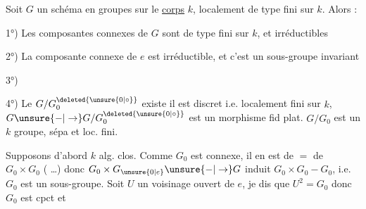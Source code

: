 
Soit $G$ un schéma en groupes sur le \uline{corps} $k$,
localement de type fini sur $k$. Alors :


1°) Les composantes connexes  de $G$ sont de type
fini sur $k$, et irréductibles

2°) La composante connexe  de $e$ est
 irréductible, et c'est un sous-groupe invariant

3°)  

4°) Le  $G/G^{\deleted{\unsure{0|\circ}}}_0$ existe il est discret i.e.
localement fini sur $k$, $G\unsure{-|\to}G/G^{\deleted{\unsure{0|\circ}}}_0$ est
un morphisme  fid plat. $G/G_0$ est
un $k$ groupe, sépa et loc. fini. 

Supposons d'abord $k$ alg. clos. 
 Comme $G_0$ est connexe,
il en est de $=$ de $G_0\times G_0$ ( \ldots)
donc $G_0\times G_{\unsure{0|e}}\unsure{-|\to}G$ induit $G_0\times G_0-G_0$,
i.e. $G_0$ est un sous-groupe. Soit $U$
un voisinage ouvert  de $e$, je dis que
$U^2=G_0$  donc $G_0$ est  cpct et
